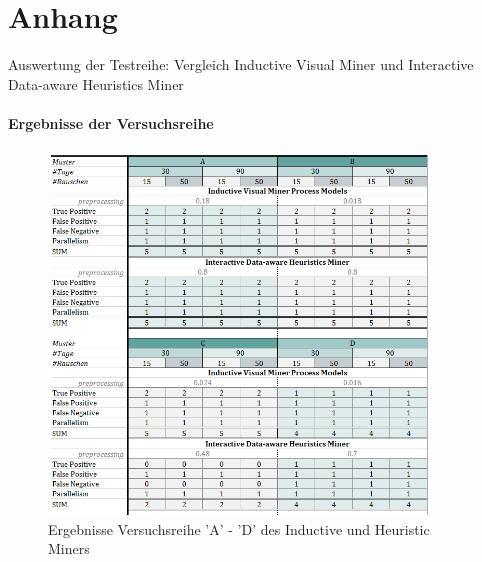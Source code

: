 \chapter*{Anhang} \fancyhead[RE,RO]{}
Auswertung der Testreihe: Vergleich Inductive Visual Miner und Interactive Data-aware Heuristics Miner
\captionsetup[table]{list=no}
\captionsetup[figure]{list=no}
\subsubsection{Ergebnisse der Versuchsreihe}\label{results}
\begin{figure}[!ht]
    \centering
    \includegraphics[width=0.9\textwidth]{figures/Appbildungen/tab1.PNG}
    \caption{Ergebnisse Versuchsreihe 'A' - 'D' des Inductive und Heuristic Miners}
    \label{tab1}
\end{figure}

